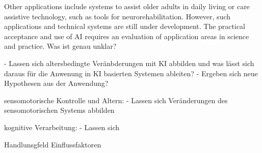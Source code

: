  Other applications include systems to assist older adults in daily living or care assistive technology, such as tools for neurorehabilitation. However, such applications and technical systems are still under development. The practical acceptance and use of AI requires an evaluation of application areas in science and practice. 
Was ist genau unklar? 


- Lassen sich altersbedingte Veränbderungen mit KI abbilden und was lässt sich daraus für die Anwenung in KI basierten Systemen ableiten? 
- Ergeben sich neue Hypothesen aus der Anwendung? 


sensomotorische Kontrolle und Altern: 
- Lassen sich Veränderungen des sensomotorischen Systems abbilden 

kognitive Verarbeitung: 
- Lassen sich 

Handlunsgfeld Einflussfaktoren 





